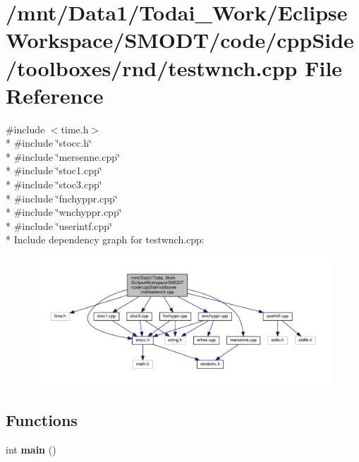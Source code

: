 \section{/mnt/\-Data1/\-Todai\-\_\-\-Work/\-Eclipse\-Workspace/\-S\-M\-O\-D\-T/code/cpp\-Side/toolboxes/rnd/testwnch.cpp File Reference}
\label{toolboxes_2rnd_2testwnch_8cpp}
{\ttfamily \#include $<$time.\-h$>$}\\*
{\ttfamily \#include \char`\"{}stocc.\-h\char`\"{}}\\*
{\ttfamily \#include \char`\"{}mersenne.\-cpp\char`\"{}}\\*
{\ttfamily \#include \char`\"{}stoc1.\-cpp\char`\"{}}\\*
{\ttfamily \#include \char`\"{}stoc3.\-cpp\char`\"{}}\\*
{\ttfamily \#include \char`\"{}fnchyppr.\-cpp\char`\"{}}\\*
{\ttfamily \#include \char`\"{}wnchyppr.\-cpp\char`\"{}}\\*
{\ttfamily \#include \char`\"{}userintf.\-cpp\char`\"{}}\\*
Include dependency graph for testwnch.\-cpp\-:
\nopagebreak
\begin{figure}[H]
\begin{center}
\leavevmode
\includegraphics[width=350pt]{toolboxes_2rnd_2testwnch_8cpp__incl}
\end{center}
\end{figure}
\subsection*{Functions}
\begin{DoxyCompactItemize}
\item 
int {\bf main} ()
\end{DoxyCompactItemize}


